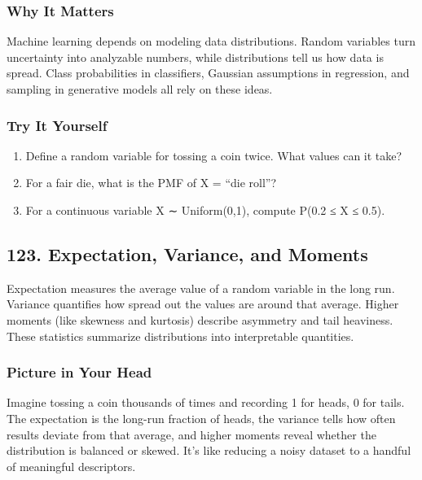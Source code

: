 \documentclass[
  letterpaper,
  DIV=11,
  numbers=noendperiod]{scrreprt}
\providecommand{\tightlist}{%
  \setlength{\itemsep}{0pt}\setlength{\parskip}{0pt}}
\begin{document}
\subsubsection{Why It Matters}\label{why-it-matters-19}

Machine learning depends on modeling data distributions. Random
variables turn uncertainty into analyzable numbers, while distributions
tell us how data is spread. Class probabilities in classifiers, Gaussian
assumptions in regression, and sampling in generative models all rely on
these ideas.

\subsubsection{Try It Yourself}\label{try-it-yourself-121}

\begin{enumerate}
\def\labelenumi{\arabic{enumi}.}
\tightlist
\item
  Define a random variable for tossing a coin twice. What values can it
  take?
\item
  For a fair die, what is the PMF of X = ``die roll''?
\item
  For a continuous variable X ∼ Uniform(0,1), compute P(0.2 ≤ X ≤ 0.5).
\end{enumerate}

\subsection{123. Expectation, Variance, and
Moments}\label{expectation-variance-and-moments}

Expectation measures the average value of a random variable in the long
run. Variance quantifies how spread out the values are around that
average. Higher moments (like skewness and kurtosis) describe asymmetry
and tail heaviness. These statistics summarize distributions into
interpretable quantities.

\subsubsection{Picture in Your Head}\label{picture-in-your-head-122}

Imagine tossing a coin thousands of times and recording 1 for heads, 0
for tails. The expectation is the long-run fraction of heads, the
variance tells how often results deviate from that average, and higher
moments reveal whether the distribution is balanced or skewed. It's like
reducing a noisy dataset to a handful of meaningful descriptors.
\end{document}
